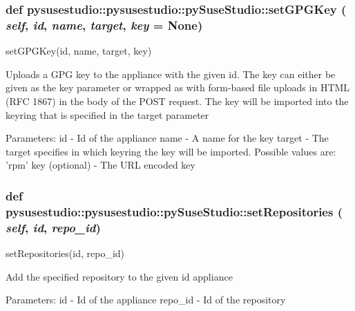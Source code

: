  \hypertarget{classpysusestudio_1_1pysusestudio_1_1py_suse_studio_a1779e38919124f1b61fb530d9921a890}{
\subsubsection[{setGPGKey}]{\setlength{\rightskip}{0pt plus 5cm}def pysusestudio::pysusestudio::pySuseStudio::setGPGKey ( {\em self}, \/   {\em id}, \/   {\em name}, \/   {\em target}, \/   {\em key} = {\ttfamily None})}}
\label{classpysusestudio_1_1pysusestudio_1_1py_suse_studio_a1779e38919124f1b61fb530d9921a890}
\begin{DoxyVerb}setGPGKey(id, name, target, key)

            Uploads a GPG key to the appliance with the given id. The key can either be given as the key parameter 
	    or wrapped as with form-based file uploads in HTML (RFC 1867) in the body of the POST request. 
	    The key will be imported into the keyring that is specified in the target parameter
            
            Parameters:
id - Id of the appliance
name - A name for the key
target - The target specifies in which keyring the key will be imported. Possible values are: 'rpm'
key (optional) - The URL encoded key

\end{DoxyVerb}
 \hypertarget{classpysusestudio_1_1pysusestudio_1_1py_suse_studio_a3cd33281e07ef979257a943307365dd9}{
\subsubsection[{setRepositories}]{\setlength{\rightskip}{0pt plus 5cm}def pysusestudio::pysusestudio::pySuseStudio::setRepositories ( {\em self}, \/   {\em id}, \/   {\em repo\_\-id})}}
\label{classpysusestudio_1_1pysusestudio_1_1py_suse_studio_a3cd33281e07ef979257a943307365dd9}
\begin{DoxyVerb}setRepositories(id, repo_id)

            Add the specified repository to the given id appliance
            
            Parameters:
id - Id of the appliance
repo_id - Id of the repository

\end{DoxyVerb}
